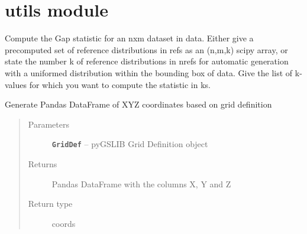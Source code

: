 \documentclass[letterpaper,10pt,english]{sphinxmanual}
\begin{document}

\begin{fulllineitems}
\label{index:pygeos.plot.probplt}
\end{fulllineitems}



\chapter{utils module}
\label{index:module-pygeos.utils}\label{index:utils-module}

\begin{fulllineitems}
\label{index:pygeos.utils.gap}
Compute the Gap statistic for an nxm dataset in data.
Either give a precomputed set of reference distributions in refs as an (n,m,k) scipy array,
or state the number k of reference distributions in nrefs for automatic generation with a
uniformed distribution within the bounding box of data.
Give the list of k-values for which you want to compute the statistic in ks.

\end{fulllineitems}


\begin{fulllineitems}
\label{index:pygeos.utils.getcoords}
Generate Pandas DataFrame of XYZ coordinates based on grid definition
\begin{quote}\begin{description}
\item[{Parameters}] \leavevmode
\textbf{\texttt{GridDef}} -- pyGSLIB Grid Definition object

\item[{Returns}] \leavevmode
Pandas DataFrame with the columns X, Y and Z

\item[{Return type}] \leavevmode
coords

\end{description}\end{quote}

\end{fulllineitems}
\end{document}
